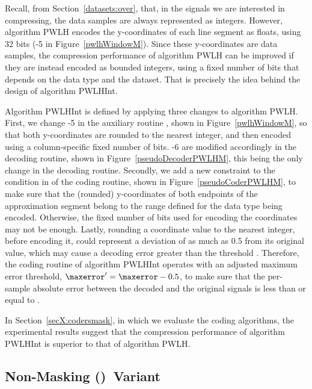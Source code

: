 Recall, from Section~\ref{datasets:over}, that, in the signals we are interested in compressing, the data samples are always represented as integers. However, algorithm PWLH encodes the y-coordinates of each line segment as floats, using 32 bits (-5 in Figure~\ref{pwlhWindowM}). Since these y-coordinates are data samples, the compression performance of algorithm PWLH can be improved if they are instead encoded as bounded integers, using a fixed number of bits that depends on the data type and the dataset. That is precisely the idea behind the design of algorithm PWLHInt.


Algorithm PWLHInt is defined by applying three changes to algorithm PWLH. First, we change -5 in the auxiliary routine \EncodeWindow, shown in Figure~\ref{pwlhWindowM}, so that both y-coordinates are rounded to the nearest integer, and then encoded using a column-specific fixed number of bits. -6 are modified accordingly in the decoding routine, shown in Figure~\ref{pseudoDecoderPWLHM}, this being the only change in the decoding routine. Secondly, we add a new constraint to the condition in  of the coding routine, shown in Figure~\ref{pseudoCoderPWLHM}, to make sure that the (rounded) y-coordinates of both endpoints of the approximation segment belong to the range defined for the data type being encoded. Otherwise, the fixed number of bits used for encoding the coordinates may not be enough. Lastly, rounding a coordinate value to the nearest integer, before encoding it, could represent a deviation of as much as 0.5 from its original value, which may cause a decoding error greater than the threshold \maxerror. Therefore, the coding routine of algorithm PWLHInt operates with an adjusted maximum error threshold, $\maxerror' = \maxerror - 0.5$, to make sure that the per-sample absolute error between the decoded and the original signals is less than or equal to \maxerror.


In Section~\ref{secX:codersmask}, in which we evaluate the coding algorithms, the experimental results suggest that the compression performance of algorithm PWLHInt is superior to that of algorithm PWLH.




\subsection{Non-Masking (\NOmaskalgo)\ Variant}
\label{algo:pwhl:nmvariant}


